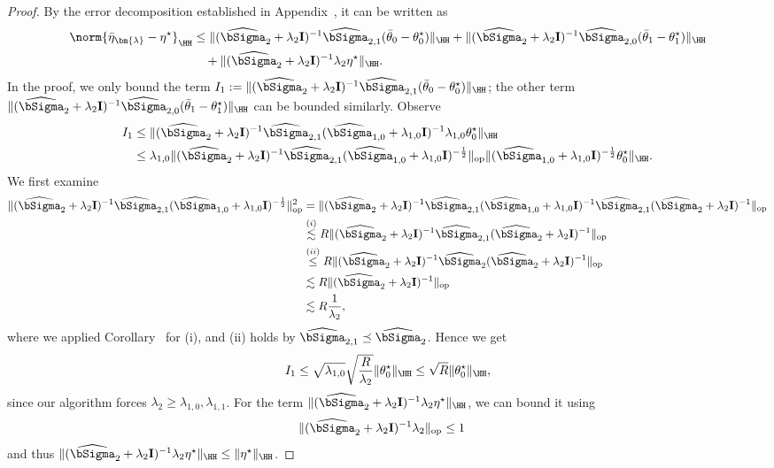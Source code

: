 \documentclass[12pt,a4paper,pdftex,onepage]{article}
\newcommand{\Sighat}{\widehat{{\bSigma}}}
\newcommand{\op}{\operatorname{op}}
\begin{document}
\begin{proof}
By the error decomposition established in Appendix~, it can be written as
\begin{align*}
\norm{\bar{\eta}_{\bm{\lambda}} - \eta^\star}_{\HH} &\leq \|(\Sighat_2 + \lambda_2 \mathbf{I})^{-1} \Sighat_{2,1}(\bar{\theta}_0 -\theta_0^\star) \|_{\HH} + \| (\Sighat_2 + \lambda_2 \mathbf{I})^{-1} \Sighat_{2,0}(\bar{\theta}_1 -\theta_1^\star) \|_{\HH} \\
&\quad+ \|(\Sighat_2 + \lambda_2 \mathbf{I})^{-1}\lambda_2 \eta^\star  \|_{\HH}.
\end{align*}
In the proof, we only bound the term $I_1 := \|(\Sighat_2 + \lambda_2 \mathbf{I})^{-1} \Sighat_{2,1}(\bar{\theta}_0 -\theta_0^\star) \|_{\HH}$; the other term $ \| (\Sighat_2 + \lambda_2 \mathbf{I})^{-1} \Sighat_{2,0}(\bar{\theta}_1 -\theta_1^\star) \|_{\HH} $ can be bounded similarly.
Observe
\begin{align*}
I_1 &\leq \| (\Sighat_2 + \lambda_2 \mathbf{I})^{-1}  \Sighat_{2,1} (\Sighat_{1,0}+\lambda_{1,0} \mathbf{I})^{-1} \lambda_{1,0}\theta_0^\star\|_{\HH} \\
&\leq \lambda_{1,0} \| (\Sighat_2 + \lambda_2 \mathbf{I})^{-1}  \Sighat_{2,1} (\Sighat_{1,0}+\lambda_{1,0} \mathbf{I})^{-\frac{1}{2}}\|_{\op} \|(\Sighat_{1,0}+\lambda_{1,0} \mathbf{I})^{-\frac{1}{2}}\theta_0^\star \|_{\HH}.
\end{align*}    
We first examine 
\begin{align*}
\| (\Sighat_2 + \lambda_2 \mathbf{I})^{-1}  \Sighat_{2,1} (\Sighat_{1,0}+\lambda_{1,0} \mathbf{I})^{-\frac{1}{2}}\|^2_{\op}  
&= \| (\Sighat_2 + \lambda_2 \mathbf{I})^{-1}  \Sighat_{2,1} (\Sighat_{1,0}+\lambda_{1,0} \mathbf{I})^{-1} \Sighat_{2,1}(\Sighat_2 + \lambda_2 \mathbf{I})^{-1}\|_{\op} \\
&\stackrel{(i)}{\lesssim} R \| (\Sighat_2 + \lambda_2 \mathbf{I})^{-1}  \Sighat_{2,1}(\Sighat_2 + \lambda_2 \mathbf{I})^{-1}\|_{\op} \\
&\stackrel{(ii)}{\leq} R  \| (\Sighat_2 + \lambda_2 \mathbf{I})^{-1}  \Sighat_{2}(\Sighat_2 + \lambda_2 \mathbf{I})^{-1}\|_{\op} \\
&\lesssim R  \| (\Sighat_2 + \lambda_2 \mathbf{I})^{-1}\|_{\op} \\
&\lesssim R \frac{1}{\lambda_2},
\end{align*}
where we applied Corollary~ for (i), and (ii) holds by $\Sighat_{2,1} \preceq \Sighat_2$.
Hence we get 
\begin{align*}
I_1 \leq  \sqrt{\lambda_{1,0}} \sqrt{\frac{R}{\lambda_2}} \|\theta_0^\star \|_{\HH} \leq \sqrt{R}\|\theta_0^\star \|_{\HH},
\end{align*}
since our algorithm forces \(\lambda_2 \geq \lambda_{1,0}, \lambda_{1,1}\).
For the term \(\|(\Sighat_2 + \lambda_2 \mathbf{I})^{-1}\lambda_2 \eta^\star  \|_{\HH}\), we can bound it using 
\begin{align*}
\|(\Sighat_2 + \lambda_2 \mathbf{I})^{-1}\lambda_2\|_{\op} &\leq 1
\end{align*}
and thus \(\|(\Sighat_2 + \lambda_2 \mathbf{I})^{-1}\lambda_2 \eta^\star  \|_{\HH} \leq \|\eta^\star \|_{\HH}\).
\end{proof}
\end{document}
